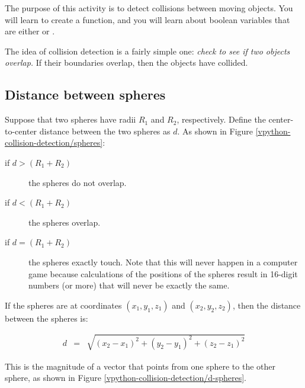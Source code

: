 
\apparatus
{}

\longgoal

The purpose of this activity is to detect collisions between moving objects. You will learn to create a function, and you will learn about boolean variables that are either  or .

\introduction

The idea of collision detection is a fairly simple one: \emph{check to see if two objects overlap.} If their boundaries overlap, then the objects have collided.

\subsection*{Distance between spheres}

Suppose that two spheres have radii $R_1$ and $R_2$, respectively. Define the center-to-center distance between the two spheres as $d$. As shown in Figure \ref{vpython-collision-detection/spheres}:

\begin{description}
	\item[if $d>(R_1+R_2)$] the spheres do not overlap.
	\item[if $d<(R_1+R_2)$] the spheres overlap.
	\item[if $d=(R_1+R_2)$] the spheres exactly touch. Note that this will never happen in a computer game because calculations of the positions of the spheres result in 16-digit numbers (or more) that will never be exactly the same.
\end{description}


If the spheres are at coordinates $(x_1, y_1, z_1)$ and $(x_2, y_2, z_2)$, then the distance between the spheres is:

\begin{eqnarray*}
	d & = & \sqrt{(x_2-x_1)^2 + (y_2-y_1)^2 + (z_2-z_1)^2}
\end{eqnarray*}

This is the magnitude of a vector that points from one sphere to the other sphere, as shown in Figure \ref{vpython-collision-detection/d-spheres}. 


